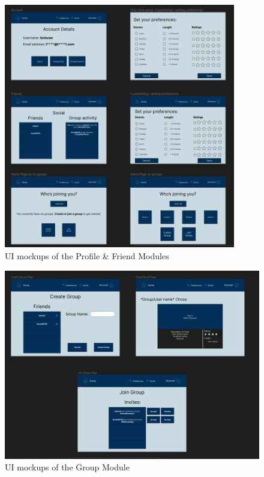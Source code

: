 \documentclass[12pt, titlepage]{article}
\begin{document}
\begin{figure}[H]
	\centering
	\includegraphics[width=0.9\textwidth]{figma/profile.png}
	\caption{UI mockups of the Profile \& Friend Modules}
	\label{FigUH}
\end{figure}

\begin{figure}[H]
	\centering
	\includegraphics[width=1\textwidth]{figma/groups.png}
	\caption{UI mockups of the Group Module}
	\label{FigUH}
\end{figure}
\end{document}
